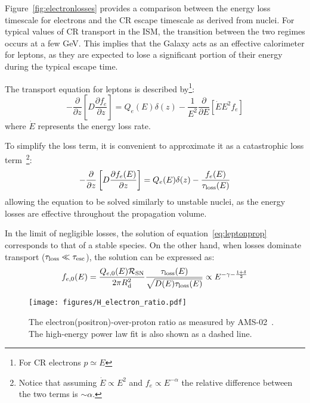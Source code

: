 Figure~\ref{fig:electronlosses} provides a comparison between the energy loss timescale for electrons and the CR escape timescale as derived from nuclei. For typical values of CR transport in the ISM, the transition between the two regimes occurs at a few GeV. This implies that the Galaxy acts as an effective calorimeter for leptons, as they are expected to lose a significant portion of their energy during the typical escape time.

The transport equation for leptons is described by\footnote{For CR electrons $p \simeq E$}:
%
\begin{equation}
-\frac{\partial}{\partial z} \left [D \frac{\partial f_e}{\partial z} \right] 
= Q_e(E) \delta(z)
- \frac{1}{E^2} \frac{\partial}{\partial E} \left[ \dot E E^2 f_e \right] 
\end{equation}
%
where $\dot E$ represents the energy loss rate.

To simplify the loss term, it is convenient to approximate it as a catastrophic loss term~\footnote{Notice that assuming $\dot E \propto E^2$ and $f_e \propto E^{-\alpha}$ the relative difference between the two terms is $\sim\alpha$.}:
%
\begin{equation}
-\frac{\partial}{\partial z} \left [D \frac{\partial f_e(E)}{\partial z} \right] = Q_e(E) \delta(z) - \frac{f_e(E)}{\tau_{\rm loss}(E)}  
\label{eq:leptonprop}
\end{equation}
%
allowing the equation to be solved similarly to unstable nuclei, as the energy losses are effective throughout the propagation volume.

In the limit of negligible losses, the solution of equation~\eqref{eq:leptonprop} corresponds to that of a stable species. On the other hand, when losses dominate transport ($\tau_{\rm loss} \ll \tau_{\rm esc}$), the solution can be expressed as:
%
\begin{equation}f_{e,0}(E) 
= \frac{Q_{e,0}(E) \mathcal R_{\rm SN}}{2 \pi R_{\rm d}^2} \frac{\tau_{\rm loss}(E)}{\sqrt{D(E)\tau_{\rm loss}(E)}}
\propto E^{{-\gamma}-\frac{1 + \delta}{2}}
\label{eq:leptonsolution}
\end{equation}

\begin{figure}[t]
\centering
\texttt{[image: figures/H\_electron\_ratio.pdf]}
\caption{The electron(positron)-over-proton ratio as measured by AMS-02~\cite{AMS02.2019.electrons}. The high-energy power law fit is also shown as a dashed line.}
\label{fig:protonelectron}
\end{figure}

